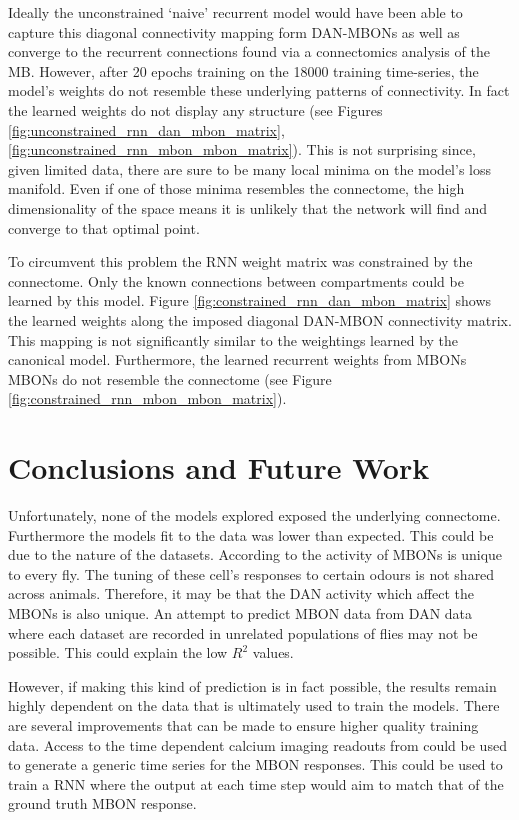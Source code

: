 \documentclass[11pt, A4]{article}
\begin{document}
\begin{multicols}{2}
Ideally the unconstrained `naive' recurrent model would have been able to capture this diagonal connectivity mapping form DAN-MBONs as well as converge to the recurrent connections found via a connectomics analysis of the MB. However, after 20 epochs training on the 18000 training time-series, the model's weights do not resemble these underlying patterns of connectivity. In fact the learned weights do not display any structure (see Figures \ref{fig:unconstrained_rnn_dan_mbon_matrix}, \ref{fig:unconstrained_rnn_mbon_mbon_matrix}). This is not surprising since, given limited data, there are sure to be many local minima on the model's loss manifold. Even if one of those minima resembles the connectome, the high dimensionality of the space means it is unlikely that the network will find and converge to that optimal point. 

To circumvent this problem the RNN weight matrix was constrained by the connectome. Only the known connections between compartments could be learned by this model. Figure \ref{fig:constrained_rnn_dan_mbon_matrix} shows the learned weights along the imposed diagonal DAN-MBON connectivity matrix. This mapping is not significantly similar to the weightings learned by the canonical model. Furthermore, the learned recurrent weights from MBONs MBONs do not resemble the connectome (see Figure \ref{fig:constrained_rnn_mbon_mbon_matrix}).


\section{Conclusions and Future Work}
Unfortunately, none of the models explored exposed the underlying connectome. Furthermore the models fit to the data was lower than expected. This could be due to the nature of the datasets. According to \cite{hige2015} the activity of MBONs is unique to every fly. The tuning of these cell's responses to certain odours is not shared across animals. Therefore, it may be that the DAN activity which affect the MBONs is also unique. An attempt to predict MBON data from DAN data where each dataset are recorded in unrelated populations of flies may not be possible. This could explain the low $R^2$ values.

However, if making this kind of prediction is in fact possible, the results remain highly dependent on the data that is ultimately used to train the models. There are several improvements that can be made to ensure higher quality training data. Access to the time dependent calcium imaging readouts from \cite{hige2015} could be used to generate a generic time series for the MBON responses. This could be used to train a RNN where the output at each time step would aim to match that of the ground truth MBON response. 


\end{multicols}
\end{document}
